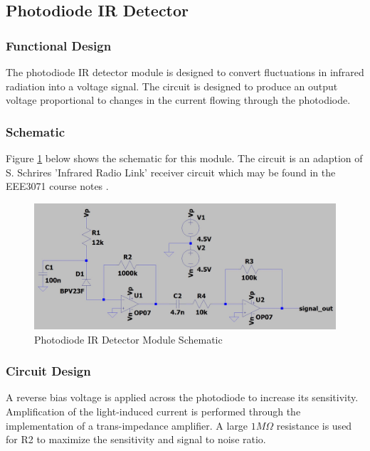 



\subsection{Photodiode IR Detector}

\subsubsection{Functional Design}
The photodiode IR detector module is designed to convert fluctuations in infrared radiation into a voltage signal. The circuit is designed to produce an output voltage proportional to changes in the current flowing through the photodiode.


\subsubsection{Schematic}
Figure \ref{fig:schematic_photodiode_transimpedance} below shows the schematic for this module. The circuit is an adaption of S. Schrires 'Infrared Radio Link' receiver circuit which may be found in the EEE3071 course notes \cite{Schrire2007}.

\begin{figure}[H]
	\centering
	\includegraphics[width=.8\textwidth]{figures/design/photodiode_transimpedance.JPG}
	\caption{Photodiode IR Detector Module Schematic}
	\label{fig:schematic_photodiode_transimpedance}
\end{figure}

\subsubsection{Circuit Design}
A reverse bias voltage is applied across the photodiode to increase its sensitivity. Amplification of the light-induced current is performed through the implementation of a trans-impedance amplifier. A large $1M\Omega$ resistance is used for R2 to maximize the sensitivity and signal to noise ratio.

